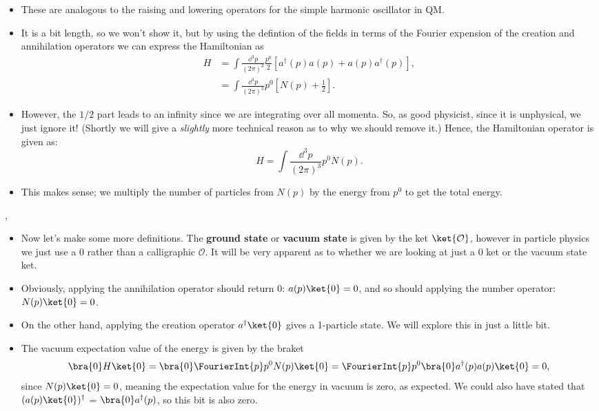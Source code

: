 \begin{itemize}
    \item These are analogous to the raising and lowering operators for the simple harmonic oscillator in QM.
    \item It is a bit length, so we won't show it, but by using the defintion of the fields in terms of the Fourier expension of the creation and annihilation operators we can express the Hamiltonian as
        \begin{align*}
            H &= \int \frac{\dd^3p}{(2\pi)^3} \frac{p^0}{2} \left[ a^{\dagger}(p)a(p) + a(p)a^{\dagger}(p) \right], \\
            &= \int \frac{\dd^3p}{(2\pi)^3} p^0 \left[ N(p) + \frac{1}{2} \right].
        \end{align*}
    \item However, the $1/2$ part leads to an infinity since we are integrating over all momenta. So, as good physicist, since it is unphysical, we just ignore it! (Shortly we will give a \textit{slightly} more technical reason as to why we should remove it.) Hence, the Hamiltonian operator is given as:
        \begin{equation}
            H = \int \frac{\dd^3p}{(2\pi)^3} p^0 N(p).
        \end{equation}
    \item This makes sense; we multiply the number of particles from $N(p)$ by the energy from $p^0$ to get the total energy.
\end{itemize}

\sep

\begin{itemize}
    \item Now let's make some more definitions. The \textbf{ground state} or \textbf{vacuum state} is given by the ket $\ket{\mathcal{O}}$, however in particle physics we just use a 0 rather than a calligraphic $\mathcal{O}$. It will be very apparent as to whether we are looking at just a 0 ket or the vacuum state ket.
    \item Obviously, applying the annihilation operator should return 0: $a(p)\ket{0} = 0$, and so should applying the number operator: $N(p)\ket{0} = 0$.
    \item On the other hand, applying the creation operator $a^{\dagger}\ket{0}$ gives a 1-particle state. We will explore this in just a little bit.
    \item The vacuum expectation value of the energy is given by the braket
        \begin{equation*}
            \bra{0}H\ket{0} = \bra{0} \FourierInt{p} p^0N(p) \ket{0} = \FourierInt{p} p^0 \bra{0} a^{\dagger}(p) a(p) \ket{0} = 0,
        \end{equation*}
        since $N(p)\ket{0} = 0$, meaning the expectation value for the energy in vacuum is zero, as expected. We could also have stated that $(a(p)\ket{0})^{\dagger}$ = $\bra{0}a^{\dagger}(p)$, so this bit is also zero.
\end{itemize}

